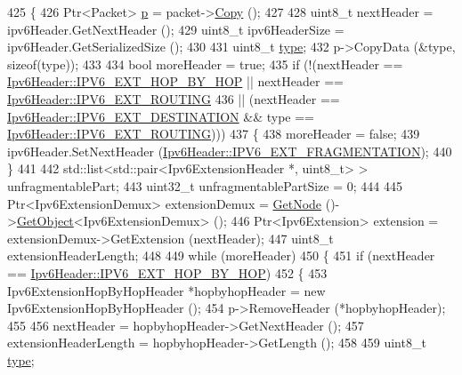 \begin{DoxyCode}
425 \{
426   Ptr<Packet> \hyperlink{lte__link__budget_8m_ac9de518908a968428863f829398a4e62}{p} = packet->\hyperlink{classns3_1_1Packet_a5d5c70802a5f77fc5f0001e0cfc1898b}{Copy} ();
427 
428   uint8\_t nextHeader = ipv6Header.GetNextHeader ();
429   uint8\_t ipv6HeaderSize = ipv6Header.GetSerializedSize ();
430 
431   uint8\_t \hyperlink{visualizer-ideas_8txt_add98db9e15e2a58cf2b57623e7aa893a}{type};
432   p->CopyData (&type, \textcolor{keyword}{sizeof}(type));
433 
434   \textcolor{keywordtype}{bool} moreHeader = \textcolor{keyword}{true};
435   \textcolor{keywordflow}{if} (!(nextHeader == \hyperlink{classns3_1_1Ipv6Header_a226429221a066c5e3b1f260caf27d1e9aa0413202f88bebb4f91a138e317b6bbd}{Ipv6Header::IPV6\_EXT\_HOP\_BY\_HOP} || nextHeader == 
      \hyperlink{classns3_1_1Ipv6Header_a226429221a066c5e3b1f260caf27d1e9a4f6f9116305705bc2b3d04ff5c4bd2a8}{Ipv6Header::IPV6\_EXT\_ROUTING}
436         || (nextHeader == \hyperlink{classns3_1_1Ipv6Header_a226429221a066c5e3b1f260caf27d1e9abfe6e82da1c9945685a3bf9dbfbe974b}{Ipv6Header::IPV6\_EXT\_DESTINATION} && type == 
      \hyperlink{classns3_1_1Ipv6Header_a226429221a066c5e3b1f260caf27d1e9a4f6f9116305705bc2b3d04ff5c4bd2a8}{Ipv6Header::IPV6\_EXT\_ROUTING})))
437     \{
438       moreHeader = \textcolor{keyword}{false};
439       ipv6Header.SetNextHeader (\hyperlink{classns3_1_1Ipv6Header_a226429221a066c5e3b1f260caf27d1e9a5839daf3fdfb16dfdc94a208ca6ebc5a}{Ipv6Header::IPV6\_EXT\_FRAGMENTATION});
440     \}
441 
442   std::list<std::pair<Ipv6ExtensionHeader *, uint8\_t> > unfragmentablePart;
443   uint32\_t unfragmentablePartSize = 0;
444 
445   Ptr<Ipv6ExtensionDemux> extensionDemux = \hyperlink{classns3_1_1Ipv6Extension_a71cc2e202ef7605b1f645d8c6a384657}{GetNode} ()->\hyperlink{classns3_1_1Object_a13e18c00017096c8381eb651d5bd0783}{GetObject}<Ipv6ExtensionDemux> ();
446   Ptr<Ipv6Extension> extension = extensionDemux->GetExtension (nextHeader);
447   uint8\_t extensionHeaderLength;
448 
449   \textcolor{keywordflow}{while} (moreHeader)
450     \{
451       \textcolor{keywordflow}{if} (nextHeader == \hyperlink{classns3_1_1Ipv6Header_a226429221a066c5e3b1f260caf27d1e9aa0413202f88bebb4f91a138e317b6bbd}{Ipv6Header::IPV6\_EXT\_HOP\_BY\_HOP})
452         \{
453           Ipv6ExtensionHopByHopHeader *hopbyhopHeader = \textcolor{keyword}{new} Ipv6ExtensionHopByHopHeader ();
454           p->RemoveHeader (*hopbyhopHeader);
455 
456           nextHeader = hopbyhopHeader->GetNextHeader ();
457           extensionHeaderLength = hopbyhopHeader->GetLength ();
458 
459           uint8\_t \hyperlink{visualizer-ideas_8txt_add98db9e15e2a58cf2b57623e7aa893a}{type};

\end{DoxyCode}
